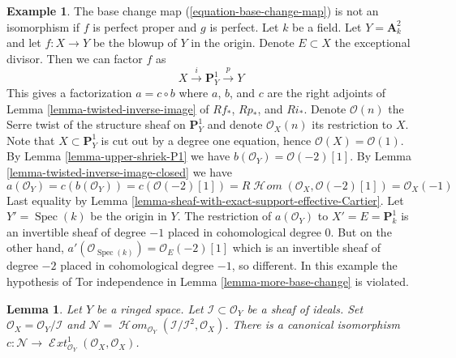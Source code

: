 \documentclass{stacks-project}
\theoremstyle{plain}
\newtheorem{lemma}[subsection]{Lemma}
\theoremstyle{definition}
\newtheorem{example}[subsection]{Example}
\theoremstyle{remark}
\numberwithin{equation}{subsection}
\def\Spec{\mathop{\mathrm{Spec}}}
\def\SheafHom{\mathop{\mathcal{H}\!\mathit{om}}\nolimits}
\def\SheafExt{\mathop{\mathcal{E}\!\mathit{xt}}\nolimits}
\begin{document}
\begin{example}
\label{example-base-change-wrong}
The base change map (\ref{equation-base-change-map}) is not an
isomorphism if $f$ is perfect proper and $g$ is perfect.
Let $k$ be a field. Let $Y = \mathbf{A}^2_k$ and let $f : X \to Y$
be the blowup of $Y$ in the origin. Denote $E \subset X$ the
exceptional divisor. Then we can factor $f$ as
$$
X \xrightarrow{i} \mathbf{P}^1_Y \xrightarrow{p} Y
$$
This gives a factorization $a = c \circ b$ where
$a$, $b$, and $c$ are the right adjoints of
Lemma \ref{lemma-twisted-inverse-image}
of $Rf_*$, $Rp_*$, and $Ri_*$. Denote $\mathcal{O}(n)$ the
Serre twist of the structure sheaf on $\mathbf{P}^1_Y$ and
denote $\mathcal{O}_X(n)$ its restriction to $X$.
Note that $X \subset \mathbf{P}^1_Y$ is cut out by
a degree one equation, hence $\mathcal{O}(X) = \mathcal{O}(1)$.
By Lemma \ref{lemma-upper-shriek-P1} we have
$b(\mathcal{O}_Y) = \mathcal{O}(-2)[1]$.
By Lemma \ref{lemma-twisted-inverse-image-closed}
we have
$$
a(\mathcal{O}_Y) = c(b(\mathcal{O}_Y)) =
c(\mathcal{O}(-2)[1]) =
R\SheafHom(\mathcal{O}_X, \mathcal{O}(-2)[1]) =
\mathcal{O}_X(-1)
$$
Last equality by Lemma \ref{lemma-sheaf-with-exact-support-effective-Cartier}.
Let $Y' = \Spec(k)$ be the origin in $Y$. The restriction of
$a(\mathcal{O}_Y)$ to $X' = E = \mathbf{P}^1_k$
is an invertible sheaf of degree $-1$ placed in cohomological
degree $0$. But on the other hand,
$a'(\mathcal{O}_{\Spec(k)}) = \mathcal{O}_E(-2)[1]$
which is an invertible sheaf of degree $-2$ placed in
cohomological degree $-1$, so different. In this example
the hypothesis of Tor independence in Lemma \ref{lemma-more-base-change}
is violated.
\end{example}

\begin{lemma}
\label{lemma-ext}
Let $Y$ be a ringed space. Let $\mathcal{I} \subset \mathcal{O}_Y$
be a sheaf of ideals. Set $\mathcal{O}_X = \mathcal{O}_Y/\mathcal{I}$ and
$\mathcal{N} =
\SheafHom_{\mathcal{O}_Y}(\mathcal{I}/\mathcal{I}^2, \mathcal{O}_X)$.
There is a canonical isomorphism
$c : \mathcal{N} \to
\SheafExt^1_{\mathcal{O}_Y}(\mathcal{O}_X, \mathcal{O}_X)
$.
\end{lemma}
\end{document}
